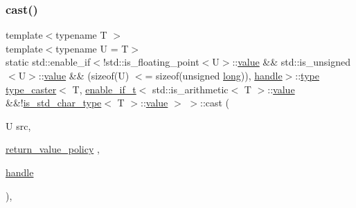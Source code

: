 \mbox{\label{structtype__caster_3_01_t_00_01enable__if__t_3_01std_1_1is__arithmetic_3_01_t_01_4_1_1value_01_624f9972c532456d927e4470192416960_aabcc3b2b1d04ead58d2b0ad1e580d92f}} 
\subsubsection{\texorpdfstring{cast()}{cast()}\hspace{0.1cm}{\footnotesize\ttfamily [3/5]}}
{\footnotesize\ttfamily template$<$typename T $>$ \\
template$<$typename U  = T$>$ \\
static std\+::enable\+\_\+if$<$!std\+::is\+\_\+floating\+\_\+point$<$U$>$\+::\mbox{\hyperlink{_s_d_l__opengl__glext_8h_a8ad81492d410ff2ac11f754f4042150f}{value}} \&\& std\+::is\+\_\+unsigned$<$U$>$\+::\mbox{\hyperlink{_s_d_l__opengl__glext_8h_a8ad81492d410ff2ac11f754f4042150f}{value}} \&\& (sizeof(U) $<$= sizeof(unsigned \mbox{\hyperlink{modsupport_8h_a0cb68e00fb9fb1260ee2daadd9fe6611}{long}})), \mbox{\hyperlink{classhandle}{handle}}$>$\+::\mbox{\hyperlink{_s_d_l__opengl_8h_ad5ddf6fca7b585646515660e810e0188}{type}} \mbox{\hyperlink{classtype__caster}{type\+\_\+caster}}$<$ T, \mbox{\hyperlink{detail_2common_8h_a012819c9e8b5e04872a271f50f8b8196}{enable\+\_\+if\+\_\+t}}$<$ std\+::is\+\_\+arithmetic$<$ T $>$\+::\mbox{\hyperlink{_s_d_l__opengl__glext_8h_a8ad81492d410ff2ac11f754f4042150f}{value}} \&\&!\mbox{\hyperlink{cast_8h_a0ee0eaf3d12f9b0e472ed620777ba3c3}{is\+\_\+std\+\_\+char\+\_\+type}}$<$ T $>$\+::\mbox{\hyperlink{_s_d_l__opengl__glext_8h_a8ad81492d410ff2ac11f754f4042150f}{value}} $>$ $>$\+::cast (\begin{DoxyParamCaption}\item[{U}]{src,  }\item[{\mbox{\hyperlink{detail_2common_8h_adde72ab1fb0dd4b48a5232c349a53841}{return\+\_\+value\+\_\+policy}}}]{,  }\item[{\mbox{\hyperlink{classhandle}{handle}}}]{ }\end{DoxyParamCaption})\hspace{0.3cm}{\ttfamily [inline]}, {\ttfamily [static]}}

